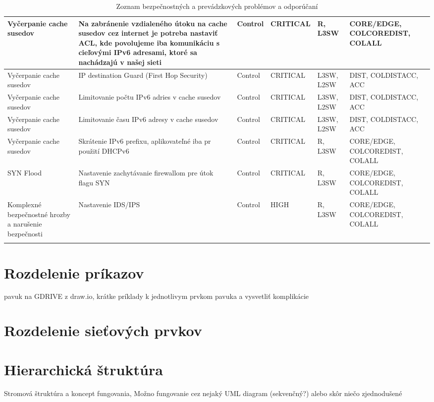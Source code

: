 \begin{longtable}{|P{8em}|P{9em}|P{8em}|P{5em}|P{5em}|P{10em}|}
    Vyčerpanie cache susedov & Na zabránenie vzdialeného útoku na cache susedov cez internet je potreba nastaviť ACL, kde povolujeme iba komunikáciu s cieľovými IPv6 adresami, ktoré sa nachádzajú v našej sieti & Control & CRITICAL & R, L3SW & CORE/EDGE, COLCOREDIST, \hbox{COLALL} \\ \hline
    Vyčerpanie cache susedov & IP destination Guard (First Hop Security) & Control & CRITICAL & L3SW, L2SW & DIST, COLDISTACC, ACC \\ \hline
    Vyčerpanie cache susedov & Limitovanie počtu IPv6 adries v cache susedov & Control & CRITICAL & L3SW, L2SW & DIST, COLDISTACC, ACC \\ \hline
    Vyčerpanie cache susedov & Limitovanie času IPv6 adresy v cache susedov & Control & CRITICAL & L3SW, L2SW & DIST, COLDISTACC, ACC \\ \hline
    Vyčerpanie cache susedov & Skrátenie IPv6 prefixu, aplikovateľné iba pr použití DHCPv6 & Control & CRITICAL & R, L3SW & CORE/EDGE, COLCOREDIST, \hbox{COLALL} \\ \hline
    SYN Flood & Nastavenie zachytávanie firewallom pre útok flagu SYN & Control & CRITICAL & R, L3SW & CORE/EDGE, COLCOREDIST, \hbox{COLALL} \\ \hline
    Komplexné bezpečnostné hrozby a narušenie bezpečnosti & Nastavenie IDS/IPS & Control & HIGH & R, L3SW & CORE/EDGE, COLCOREDIST, \hbox{COLALL} \\ \hline
		
	\caption{Zoznam bezpečnostných a prevádzkových problémov a odporúčaní}
	\label{checklist}\\
\end{longtable}

 
\section{Rozdelenie príkazov}
 pavuk na GDRIVE z draw.io, krátke príklady k jednotlivym prvkom pavuka a vysvetliť komplikácie  

\section{Rozdelenie sieťových prvkov}

\section{Hierarchická štruktúra}
Stromová štruktúra a koncept fungovania, Možno fungovanie cez nejaký UML diagram (sekvenčný?) alebo skôr niečo zjednodušené



